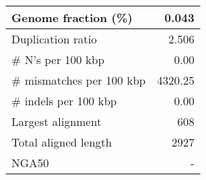 \documentclass[12pt,a4paper]{article}
\begin{document}
\begin{table}[ht]
\begin{center}
\begin{tabular}{|l*{1}{|r}|}
Genome fraction (\%) & 0.043 \\ \hline
Duplication ratio & 2.506 \\ \hline
\# N's per 100 kbp & 0.00 \\ \hline
\# mismatches per 100 kbp & 4320.25 \\ \hline
\# indels per 100 kbp & 0.00 \\ \hline
Largest alignment & 608 \\ \hline
Total aligned length & 2927 \\ \hline
NGA50 & - \\ \hline
\end{tabular}
\end{center}
\end{table}
\end{document}
